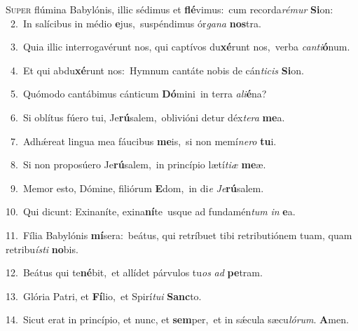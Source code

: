 \lettrine{\initial\textcolor{\initialcolor}{S}}{uper} flúmina Babylónis, illic sédimus et \textbf{flé}\-vimus:~\star cum recorda\-\textit{ré}\-\textit{mur} \textbf{Si}\-on:\\
{\numbfont\textcolor{\numbcolor}{~2.}}~In salícibus in médio \textbf{e}\-jus,~\star suspéndimus ór\-\textit{ga}\-\textit{na} \textbf{nos}\-tra.\par
{\numbfont\textcolor{\numbcolor}{~3.}}~Quia illic interrogavérunt nos, qui captívos du\-\textbf{xé}\-runt nos,~\star verba \textit{can}\-\textit{ti}\textbf{ó}num.\par
{\numbfont\textcolor{\numbcolor}{~4.}}~Et qui abdu\-\textbf{xé}\-runt nos:~\star Hymnum cantáte nobis de cán\-\textit{ti}\-\textit{cis} \textbf{Si}\-on.\par
{\numbfont\textcolor{\numbcolor}{~5.}}~Quómodo cantábimus cánticum \textbf{Dó}\-mini~\star in terra \textit{a}\-\textit{li}\textbf{é}na?\par
{\numbfont\textcolor{\numbcolor}{~6.}}~Si oblítus fúero tui, Je\-\textbf{rú}\-salem,~\star oblivióni detur déx\-\textit{te}\-\textit{ra} \textbf{me}\-a.\par
{\numbfont\textcolor{\numbcolor}{~7.}}~Adhǽreat lingua mea fáucibus \textbf{me}\-is,~\star si non memí\-\textit{ne}\-\textit{ro} \textbf{tu}\-i.\par
{\numbfont\textcolor{\numbcolor}{~8.}}~Si non proposúero Je\-\textbf{rú}\-salem,~\star in princípio lætí\-\textit{ti}\-\textit{æ} \textbf{me}\-æ.\par
{\numbfont\textcolor{\numbcolor}{~9.}}~Memor esto, Dómine, filiórum \textbf{E}\-dom,~\star in di\textit{e} \textit{Je}\-\textbf{rú}salem.\par
{\numbfont\textcolor{\numbcolor}{10.}}~Qui dicunt: Exinaníte, exina\-\textbf{ní}\-te~\star usque ad fundamén\textit{tum} \textit{in} \textbf{e}\-a.\par
{\numbfont\textcolor{\numbcolor}{11.}}~Fília Babylónis \textbf{mí}\-sera:~\star beátus, qui retríbuet tibi retributiónem tuam, quam retribu\-\textit{ís}\-\textit{ti} \textbf{no}\-bis.\par
{\numbfont\textcolor{\numbcolor}{12.}}~Beátus qui te\-\textbf{né}\-bit,~\star et allídet párvulos tu\textit{os} \textit{ad} \textbf{pe}\-tram.\par
{\numbfont\textcolor{\numbcolor}{13.}}~Glória Patri, et \textbf{Fí}\-lio,~\star et Spirí\-\textit{tu}\-\textit{i} \textbf{Sanc}\-to.\par
{\numbfont\textcolor{\numbcolor}{14.}}~Sicut erat in princípio, et nunc, et \textbf{sem}\-per,~\star et in sǽcula sæcu\-\textit{ló}\-\textit{rum}. \textbf{A}\-men.\par
